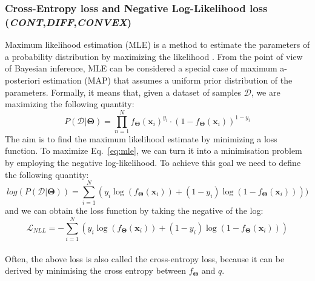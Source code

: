 \documentclass[sn-mathphys-num]{sn-jnl}%
\newcommand \cont{\textit{CONT}}
\newcommand \diff{\textit{DIFF}}
\newcommand \conv{\textit{CONVEX}}
\renewcommand\vec{\mathbf}
\begin{document}
\subsubsection{Cross-Entropy loss and Negative Log-Likelihood loss (\cont,\diff,\conv)}\label{sec:cross-entropy}
Maximum likelihood estimation (MLE) is a method to estimate the parameters of a probability distribution by maximizing the likelihood \cite{ML_2,ML_3,MLE_tutorial}. 
From the point of view of Bayesian inference, MLE can be considered a special case of maximum a-posteriori estimation (MAP) that assumes a uniform prior distribution of the parameters.
Formally, it means that, given a dataset of samples $\mathcal{D}$, we are maximizing the following quantity:
\begin{equation}\label{eq:mle}
    P(\mathcal{D}|\vec{\Theta}) = \prod_{n=1}^{N}f_{\vec{\Theta}}(\vec{x}_i)^{y_i}\cdot(1 - f_{\vec{\Theta}}(\vec{x}_i))^{1-y_i}
\end{equation}
The aim is to find the maximum likelihood estimate by minimizing a loss function. 
To maximize Eq.~\ref{eq:mle}, we can turn it into a minimisation problem by employing the negative log-likelihood. To achieve this goal we need to define the following quantity:
\begin{equation}\label{eq:log_likelihood}
    log(P(\mathcal{D}|\vec{\Theta})) = \sum_{i=1}^{N}(y_i \log(f_{\vec{\Theta}}(\vec{x}_i)) + (1-y_i) \log(1 - f_{\vec{\Theta}}(\vec{x}_i))))
\end{equation}
and we can obtain the loss function by taking the negative of the log:
\begin{equation}\label{NLL}
        \mathcal{L}_{NLL} = - \sum_{i=1}^{N}(y_i \log(f_{\vec{\Theta}}(\vec{x}_i)) + (1-y_i) \log(1 - f_{\vec{\Theta}}(\vec{x}_i)))
\end{equation}
\\
Often, the above loss is also called the cross-entropy loss, because it can be derived by minimising the cross entropy between $f_{\vec{\Theta}}$ and $q$.
\end{document}
